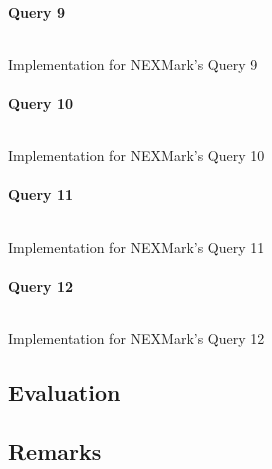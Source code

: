 \paragraph{Query 9}
\begin{listing}[H]
  \inputminted[firstline=619,lastline=655]{rust}{benchmarks/src/nexmark.rs}
  \caption{Implementation for NEXMark's Query 9}
  \label{lst:nexmark-query9}
\end{listing}

\paragraph{Query 10}
\begin{listing}[H]
  \inputminted[firstline=0,lastline=1]{rust}{benchmarks/src/nexmark.rs}
  \caption{Implementation for NEXMark's Query 10}
  \label{lst:nexmark-query10}
\end{listing}

\paragraph{Query 11}
\begin{listing}[H]
  \inputminted[firstline=0,lastline=1]{rust}{benchmarks/src/nexmark.rs}
  \caption{Implementation for NEXMark's Query 11}
  \label{lst:nexmark-query11}
\end{listing}

\paragraph{Query 12}
\begin{listing}[H]
  \inputminted[firstline=0,lastline=1]{rust}{benchmarks/src/nexmark.rs}
  \caption{Implementation for NEXMark's Query 12}
  \label{lst:nexmark-query12}
\end{listing}

\subsection{Evaluation}

\subsection{Remarks}


